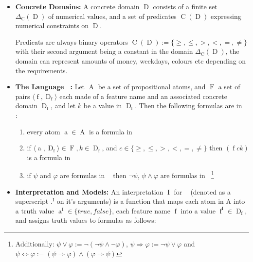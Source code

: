 \documentclass[12pt,msc,a4paper,oneside]{ucl_thesis}
\DeclareMathOperator{\Proplang}{\mathcal{L}(N)}
\DeclareMathOperator{\Propatom}{A}
\DeclareMathOperator{\propatom}{a}
\DeclareMathOperator{\Propvar}{F}
\DeclareMathOperator{\propvar}{f}
\DeclareMathOperator{\Propdom}{D}
\DeclareMathOperator{\Predicate}{C}
\DeclareMathOperator{\Interpretation}{I}
\begin{document}
\begin{itemize}
    \item
        \textbf{Concrete Domains:}\cite{Baader:1991:SIC:1631171.1631239} A concrete domain $\Propdom$ consists of a finite set $\Delta_{\Predicate}(\Propdom)$ of numerical values, and a set of predicates $\Predicate(\Propdom)$ expressing numerical constraints on $\Propdom$.

        Predicats are always binary operators $\Predicate(\Propdom) := \{\geq, \leq, >, <, =, \neq\}$ with their second argument being a constant in the domain $\Delta_{\Predicate}(\Propdom)$, the domain can represent amounts of money, weekdays, colours etc depending on the requirements\cite{Ragone2008}.

    \item
        \textbf{The Language $\Proplang$:}\cite{Ragone2008} Let $\Propatom$ be a set of propositional atoms, and $\Propvar$ a set of pairs $\langle\propvar, \Propdom_{\propvar}\rangle$ each made of a feature name and an associated concrete domain $\Propdom_{\propvar}$, and let $k$ be a value in $\Propdom_{\propvar}$. Then the following formulas are in $\Proplang$:
        \begin{enumerate}
            \item every atom $\propatom \in \Propatom$ is a formula in $\Proplang$
            \item if $\langle \propatom, \Propdom_{\propvar} \rangle \in \Propvar, k \in \Propdom_{\propvar}$, and $c \in \{\geq, \leq, >, <, =, \neq\}$ then $(\propvar ck)$ is a formula in $\Proplang$
            \item if $\psi$ and $\varphi$ are formulas in $\Proplang$ then $\neg\psi$, $\psi \wedge \varphi$ are formulas in $\Proplang$\footnote{Additionally: $\psi \vee \varphi := \neg(\neg\psi\wedge\neg\varphi)$, $\psi\Rightarrow\varphi := \neg\psi\vee\varphi$ and $\psi\Leftrightarrow\varphi := (\psi\Rightarrow\varphi)\wedge(\varphi\Rightarrow\psi)$}
        \end{enumerate}

    \item
        \textbf{Interpretation and Models:}\cite{Ragone2008} An interpretation $\Interpretation$ for $\Proplang$ (denoted as a superscript .$^{\Interpretation}$ on it's arguments) is a function that maps each atom in A into a truth value $\propatom^{\Interpretation} \in \{true, false\}$, each feature name $\propvar$ into a value $\propvar^{\Interpretation} \in \Propdom_{\propvar}$, and assigns truth values to formulas as follows:


\end{itemize}
\end{document}
